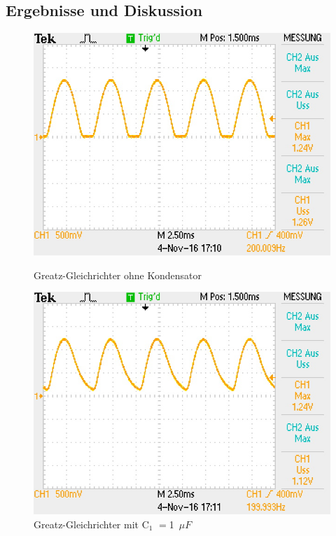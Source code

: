 \subsection{Ergebnisse und Diskussion}
\begin{figure}[!h]
\begin{minipage}{0.5\textwidth}
\begin{center}
\includegraphics[scale=0.6]{bilder/Versuch2/ohnekondensator}
\caption{Greatz-Gleichrichter ohne Kondensator}
\end{center}
\end{minipage}
\hfill
\begin{minipage}{0.4\textwidth}
\begin{center}
\includegraphics[scale=0.6]{bilder/Versuch2/mitkondensator}
\caption{Greatz-Gleichrichter mit C$_1$ $=$1~$\mu F$}
\end{center}
\end{minipage}

\end{figure}

